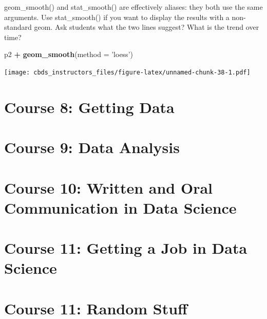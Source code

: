 \documentclass[]{book}
\newenvironment{Shaded}{\begin{snugshade}}{\end{snugshade}}
\newcommand{\DataTypeTok}[1]{\textcolor[rgb]{0.13,0.29,0.53}{#1}}
\newcommand{\KeywordTok}[1]{\textcolor[rgb]{0.13,0.29,0.53}{\textbf{#1}}}
\newcommand{\NormalTok}[1]{#1}
\newcommand{\OperatorTok}[1]{\textcolor[rgb]{0.81,0.36,0.00}{\textbf{#1}}}
\newcommand{\StringTok}[1]{\textcolor[rgb]{0.31,0.60,0.02}{#1}}
\begin{document}
geom\_smooth() and stat\_smooth() are effectively aliases: they both use the same arguments. Use stat\_smooth() if you want to display the results with a non-standard geom. Ask students what the two lines suggest? What is the trend over time?

\begin{Shaded}
\begin{Highlighting}[]
\NormalTok{p2 }\OperatorTok{+}\StringTok{ }\KeywordTok{geom_smooth}\NormalTok{(}\DataTypeTok{method =} \StringTok{'loess'}\NormalTok{)}
\end{Highlighting}
\end{Shaded}

\texttt{[image: cbds\_instructors\_files/figure-latex/unnamed-chunk-38-1.pdf]}

\hypertarget{getting-data}{%
\chapter*{Course 8: Getting Data}\label{getting-data}}

\hypertarget{analysis}{%
\chapter*{Course 9: Data Analysis}\label{analysis}}

\hypertarget{communication}{%
\chapter*{Course 10: Written and Oral Communication in Data Science}\label{communication}}

\hypertarget{getting-jobs}{%
\chapter*{Course 11: Getting a Job in Data Science}\label{getting-jobs}}

\hypertarget{random}{%
\chapter*{Course 11: Random Stuff}\label{random}}
\end{document}
